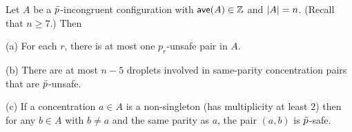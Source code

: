 \begin{lemma}%
	\label{lem: at most one mod-unsafe pairs} 
	Let $A$ be a ${\bar{p}}$-incongruent configuration with ${\textsf{ave}}(A)\in{\mathbb Z}$ and ${|A|} = n$. 
	(Recall that $n\ge 7$.)
	Then
%
\begin{description}
	\item{\textrm{(a)}} For each $r$, there is at most one $p_r$-unsafe pair in $A$.
	\item{\textrm{(b)}}	There are at most $n-5$ droplets involved
	in same-parity concentration pairs that are ${\bar{p}}$-unsafe.
	\item{\textrm{(c)}} If a concentration $a\in A$ is a non-singleton (has multiplicity at least $2$)
		then for any $b\in A$ with $b\neq a$ and the same parity as $a$, the pair $(a,b)$ is ${\bar{p}}$-safe.
\end{description}
\end{lemma}%

